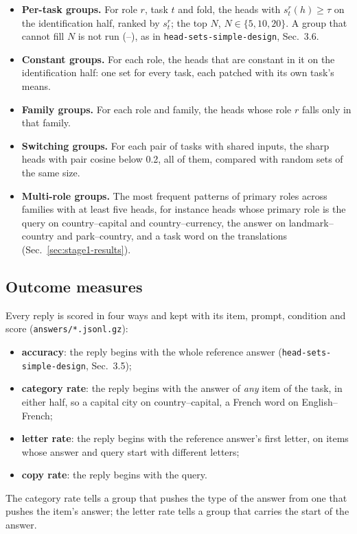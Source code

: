 \documentclass[10pt,a4paper]{article}
\newcommand{\simpledoc}{\texttt{head-sets-simple-design}}
\begin{document}
\begin{itemize}
\item \textbf{Per-task groups.} For role $r$, task $t$ and fold, the heads with $s^r_t(h)\ge\tau$ on the identification half, ranked by $s^r_t$; the top $N$, $N\in\{5,10,20\}$. A group that cannot fill $N$ is not run (--), as in \simpledoc{}, Sec.~3.6.
\item \textbf{Constant groups.} For each role, the heads that are constant in it on the identification half: one set for every task, each patched with its own task's means.
\item \textbf{Family groups.} For each role and family, the heads whose role $r$ falls only in that family.
\item \textbf{Switching groups.} For each pair of tasks with shared inputs, the sharp heads with pair cosine below 0.2, all of them, compared with random sets of the same size.
\item \textbf{Multi-role groups.} The most frequent patterns of primary roles across families with at least five heads, for instance heads whose primary role is the query on country--capital and country--currency, the answer on landmark--country and park--country, and a task word on the translations (Sec.~\ref{sec:stage1-results}).
\end{itemize}

\subsection{Outcome measures}\label{sec:measures}

Every reply is scored in four ways and kept with its item, prompt, condition and score (\texttt{answers/*.jsonl.gz}):
\begin{itemize}
\item \textbf{accuracy}: the reply begins with the whole reference answer (\simpledoc, Sec.~3.5);
\item \textbf{category rate}: the reply begins with the answer of \emph{any} item of the task, in either half, so a capital city on country--capital, a French word on English--French;
\item \textbf{letter rate}: the reply begins with the reference answer's first letter, on items whose answer and query start with different letters;
\item \textbf{copy rate}: the reply begins with the query.
\end{itemize}
The category rate tells a group that pushes the type of the answer from one that pushes the item's answer; the letter rate tells a group that carries the start of the answer.
\end{document}
